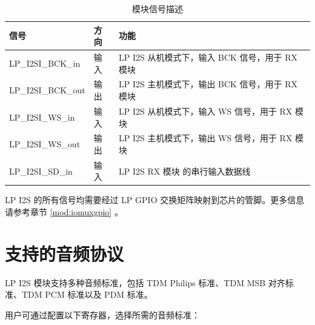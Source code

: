 \documentclass[main\_\_CN.tex]{subfiles}
\begin{document}
\begin{table}[H]
    \centering
    \caption{模块信号描述}
    \label{tab:lpi2s-signal-descr}
    \begin{threeparttable}
    \begin{tabular}{|p{3cm}|p{1.5cm}|p{8cm}| }
    \hline
    \rowcolor{lightgray}
    \textbf{信号 \tnote{*}}&\textbf{方向}&\textbf{功能}\\
    \hline
    LP\_I2SI\_BCK\_in  & 输入 & LP I2S 从机模式下，输入 BCK 信号，用于 RX 模块 \\
    \hline
    LP\_I2SI\_BCK\_out& 输出 & LP I2S 主机模式下，输出 BCK 信号，用于 RX 模块 \\
    \hline
    LP\_I2SI\_WS\_in & 输入 & LP I2S 从机模式下，输入 WS 信号，用于 RX 模块 \\
    \hline
    LP\_I2SI\_WS\_out& 输出 & LP I2S 主机模式下，输出 WS 信号，用于 RX 模块 \\\hline
    LP\_I2SI\_SD\_in& 输入 & LP I2S RX 模块 的串行输入数据线 \\\hline
    \end{tabular}
    \begin{tablenotes}
        \item[*] LP I2S 的所有信号均需要经过 LP GPIO 交换矩阵映射到芯片的管脚。更多信息请参考章节 \ref{mod:iomuxgpio} \textit{}。
    \end{tablenotes}
    \end{threeparttable}
\end{table}

\section{支持的音频协议} \label{sec:lpi2s-supported-audio-standards}

\chipname{} LP I2S 模块支持多种音频标准，包括 TDM Philips 标准、TDM MSB 对齐标准、TDM PCM 标准以及 PDM 标准。

用户可通过配置以下寄存器，选择所需的音频标准：
\end{document}
